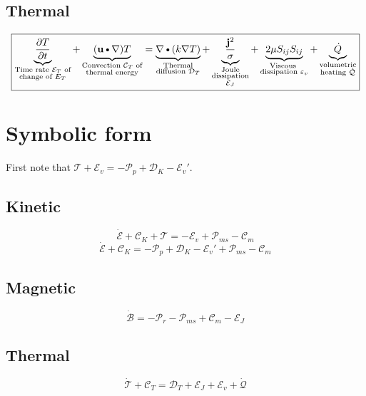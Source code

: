 \documentclass[11pt]{article}
\newcommand{\MC}{\mathcal}
\newcommand{\PD}{\partial}
\newcommand{\JSS}{\frac{\mathbf{j}^2}{\sigma}}
\newcommand{\U}{\mathbf{u}}
\newcommand{\DOT}{\text{\textbullet}}
\begin{document}
\subsection{Thermal}
\begin{equation}
	\boxed{
	\underbrace{\frac{\PD T}{\PD t}}_{\substack{\text{Time rate $\MC E_T$ of} \\ \text{change of $E_T$}}} +
	\underbrace{(\U \DOT \nabla) T}_{\substack{\text{Convection $\MC C_T$ of} \\ \text{thermal energy}}}
	= 
	\underbrace{\nabla \DOT (k \nabla T)}_{\substack{\text{Thermal} \\ \text{diffusion } \MC D_T}} + 
	\underbrace{\JSS}_
	{\substack{\text{Joule}\\\text{dissipation}\\\text{$\MC E_J$}}} +
	\underbrace{2 \mu S_{ij}S_{ij}}_{\substack{\text{Viscous } \\ \text{dissipation } \varepsilon_v}} +
	\underbrace{\dot{Q}}_{\substack{\text{volumetric} \\ \text{heating } \dot{\MC Q}}}
	}
\end{equation}

\section{Symbolic form}
First note that $\MC T + \MC E_v = -\MC P_p + \MC D_K - \MC E_v'$.
\subsection{Kinetic}
\begin{equation}
	\dot{\MC E} + \MC C_K + \MC T = - \MC E_v + \MC P_{ms} - \MC C_m
\end{equation}
\begin{equation}
	\dot{\MC E} + \MC C_K = -\MC P_p + \MC D_K - \MC E_v' + \MC P_{ms} - \MC C_m
\end{equation}
\subsection{Magnetic}
\begin{equation}
	\dot{\MC B} = -\MC P_r - \MC P_{ms} + \MC C_m - \MC E_J
\end{equation}
\subsection{Thermal}
\begin{equation}
	\dot{\MC T} + \MC C_T = \MC D_T + \MC E_J + \MC E_v + \dot{\MC Q}
\end{equation}
\end{document}
